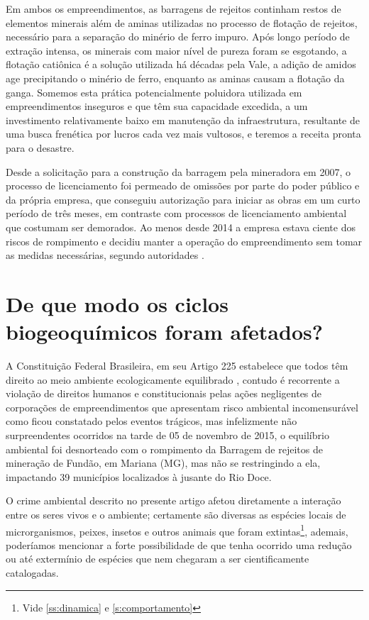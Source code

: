 \documentclass[
article,			%
11pt,				%
oneside,			%
a4paper,			%
english,			%
brazil,				%
sumario=tradicional
]{abntex2}
\begin{document}
	Em ambos os empreendimentos, as barragens de rejeitos continham restos de elementos minerais além de aminas utilizadas no processo de flotação de rejeitos, necessário para a separação do minério de ferro impuro. Após longo período de extração intensa, os minerais com maior nível de pureza foram se esgotando, a flotação catiônica é a solução utilizada há décadas pela Vale, a adição de amidos age precipitando o minério de ferro, enquanto as aminas causam a flotação da ganga. Somemos esta prática potencialmente poluidora utilizada em empreendimentos inseguros e que têm sua capacidade excedida, a um investimento relativamente baixo em manutenção da infraestrutura, resultante de uma busca frenética por lucros cada vez mais vultosos, e teremos a receita pronta para o desastre.    
	 
	Desde a solicitação para a construção da barragem pela mineradora em 2007, o processo de licenciamento foi permeado de omissões por parte do poder público e da própria empresa, que conseguiu autorização para iniciar as obras em um curto período  de três meses, em contraste com processos de licenciamento ambiental que costumam ser demorados. Ao menos desde 2014 a empresa estava ciente dos riscos de rompimento e decidiu manter a operação do empreendimento sem tomar as medidas necessárias, segundo autoridades \cite{santos2018a}.

	\section{De que modo os ciclos biogeoquímicos foram afetados?}
	
	A Constituição Federal Brasileira, em seu Artigo 225 estabelece que todos têm direito ao meio ambiente ecologicamente equilibrado \cite{brasil1988a}, contudo é recorrente a violação de direitos humanos e constitucionais pelas ações negligentes de corporações de empreendimentos que apresentam risco ambiental incomensurável como ficou constatado pelos eventos trágicos, mas infelizmente não surpreendentes ocorridos na tarde de 05 de novembro de 2015, o equilíbrio ambiental foi desnorteado com o rompimento da Barragem de rejeitos de mineração de Fundão, em Mariana (MG), mas não se restringindo a ela, impactando 39 municípios localizados à jusante do Rio Doce.
	
	O crime ambiental descrito no presente artigo afetou diretamente a interação entre os seres vivos e o ambiente; certamente são diversas as espécies locais de microrganismos, peixes, insetos e outros animais que foram extintas\footnote{Vide \autoref{ss:dinamica} e \autoref{s:comportamento}}, ademais, poderíamos mencionar a forte possibilidade de que tenha ocorrido uma redução ou até extermínio de espécies que nem chegaram a ser cientificamente catalogadas.
	
\end{document}
